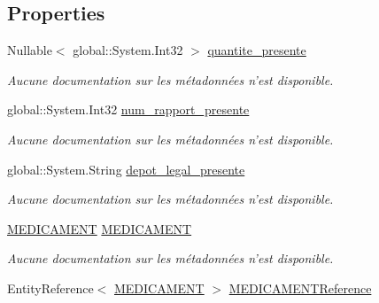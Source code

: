 \subsection*{Properties}
\begin{DoxyCompactItemize}
\item 
Nullable$<$ global\-::\-System.\-Int32 $>$ \hyperlink{class_model_1_1_p_r_e_s_e_n_t_e_afe81dda1e11f4299751d0762ec4b41a7}{quantite\-\_\-presente}
\begin{DoxyCompactList}\small\item\em Aucune documentation sur les métadonnées n'est disponible. \end{DoxyCompactList}\item 
global\-::\-System.\-Int32 \hyperlink{class_model_1_1_p_r_e_s_e_n_t_e_a61ceff1e6daaf303f9bdc311fe3f140e}{num\-\_\-rapport\-\_\-presente}
\begin{DoxyCompactList}\small\item\em Aucune documentation sur les métadonnées n'est disponible. \end{DoxyCompactList}\item 
global\-::\-System.\-String \hyperlink{class_model_1_1_p_r_e_s_e_n_t_e_a182eef0b5545f4d27fb1fbc2838a6bf7}{depot\-\_\-legal\-\_\-presente}
\begin{DoxyCompactList}\small\item\em Aucune documentation sur les métadonnées n'est disponible. \end{DoxyCompactList}\item 
\hyperlink{class_model_1_1_m_e_d_i_c_a_m_e_n_t}{M\-E\-D\-I\-C\-A\-M\-E\-N\-T} \hyperlink{class_model_1_1_p_r_e_s_e_n_t_e_a1ba7b02960d2fcfa2a5ab6f9ad072a0a}{M\-E\-D\-I\-C\-A\-M\-E\-N\-T}
\begin{DoxyCompactList}\small\item\em Aucune documentation sur les métadonnées n'est disponible. \end{DoxyCompactList}\item 
Entity\-Reference$<$ \hyperlink{class_model_1_1_m_e_d_i_c_a_m_e_n_t}{M\-E\-D\-I\-C\-A\-M\-E\-N\-T} $>$ \hyperlink{class_model_1_1_p_r_e_s_e_n_t_e_aba9cfc5f5f059bd6e19449eb96aadd3a}{M\-E\-D\-I\-C\-A\-M\-E\-N\-T\-Reference}

\end{DoxyCompactItemize}
